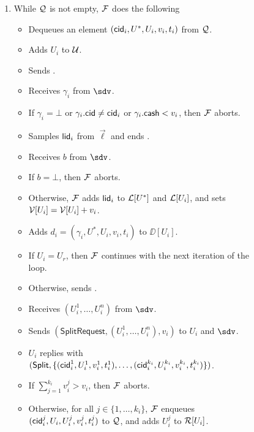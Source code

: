 \begin{figure*}[!t]
{{\begin{enumerate}
	\item While $\mathcal{Q}$ is not empty, $\mathcal{F}$ does the following
	\begin{itemize}[label=-]
		\item Dequeues an element $(\mathsf{cid}_i,U^*,U_i,v_i,t_i)$ from $\mathcal{Q}$.
		\item Adds $U_i$ to $\mathcal{U}$.
		\item Sends .
		\item Receives $\gamma_i$ from $\sdv$.
		\item If $\gamma_i = \bot$ or $\gamma_i.\mathsf{cid} \neq \mathsf{cid}_i$ or $\gamma_i.\mathsf{cash} < v_i$, 
		then $\mathcal{F}$ aborts.
		\item Samples $\mathsf{lid}_i$ from $\vec{\ell}$ and ends .
		\item Receives $b$ from $\sdv$.
		\item If $b = \bot$, then $\mathcal{F}$ aborts.
		\item Otherwise, $\mathcal{F}$ adds $\mathsf{lid}_i$ to $\mathcal{L}[U^*]$ and $\mathcal{L}[U_i]$, and sets $\mathcal{V}[U_i] = 
		\mathcal{V}[U_i] + v_i$.
		\item Adds $d_i = (\gamma_i,U^*,U_i,v_i,t_i)$ to $\DD[U_i]$.
		\item If $U_i = U_r$, then $\mathcal{F}$ continues with the next iteration of the loop.
		\item Otherwise, sends . 
		\item Receives $(U_i^1,\ldots,U_i^n)$ from $\sdv$.
		\item Sends $(\mathsf{SplitRequest}, (U_i^1,\ldots,U_i^n), v_i)$ to $U_i$ 
		and $\sdv$. 
		\item $U_i$ replies with $(\mathsf{Split}, \{(\mathsf{cid}_i^1,U_i^1,v_i^1,t_i^1),\ldots,
		(\mathsf{cid}_i^{k_i},U_i^{k_i},v_i^{k_i},t_i^{k_i})\})$.
		\item If $\textstyle\sum_{j = 1}^{k_i} v_i^j > v_i$, then $\mathcal{F}$ aborts.
		\item Otherwise, for all $j \in \{1,\ldots,k_i\}$, $\mathcal{F}$ enqueues 
		$(\mathsf{cid}_i^j,U_i,U_i^j,v_i^j,t_i^j)$ to $\mathcal{Q}$, and adds $U_i^j$ to $\mathcal{R}[U_i]$.
	\end{itemize}
	

\end{enumerate}}}
\end{figure*}
